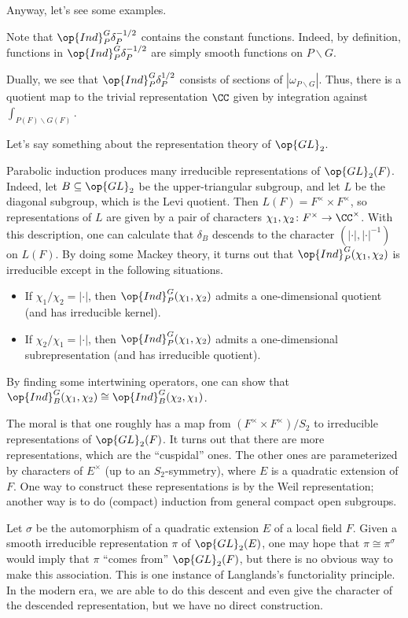 \documentclass[../notes.tex]{subfiles}
\begin{document}
Anyway, let's see some examples.
\begin{example}
	Note that $\op{Ind}_P^G\delta_P^{-1/2}$ contains the constant functions. Indeed, by definition, functions in $\op{Ind}_P^G\delta_P^{-1/2}$ are simply smooth functions on $P\backslash G$.
\end{example}
\begin{example}
	Dually, we see that $\op{Ind}_P^G\delta_P^{1/2}$ consists of sections of $\left|\omega_{P\backslash G}\right|$. Thus, there is a quotient map to the trivial representation $\CC$ given by integration against $\int_{P(F)\backslash G(F)}$.
\end{example}
Let's say something about the representation theory of $\op{GL}_2$.
\begin{example}
	Parabolic induction produces many irreducible representations of $\op{GL}_2(F)$. Indeed, let $B\subseteq\op{GL}_2$ be the upper-triangular subgroup, and let $L$ be the diagonal subgroup, which is the Levi quotient. Then $L(F)=F^\times\times F^\times$, so representations of $L$ are given by a pair of characters $\chi_1,\chi_2\colon F^\times\to\CC^\times$. With this description, one can calculate that $\delta_B$ descends to the character $\left(\left|\cdot\right|,\left|\cdot\right|^{-1}\right)$ on $L(F)$. By doing some Mackey theory, it turns out that $\op{Ind}_P^G(\chi_1,\chi_2)$ is irreducible except in the following situations.
	\begin{itemize}
		\item If $\chi_1/\chi_2=\left|\cdot\right|$, then $\op{Ind}_P^G(\chi_1,\chi_2)$ admits a one-dimensional quotient (and has irreducible kernel).
		\item If $\chi_2/\chi_1=\left|\cdot\right|$, then $\op{Ind}_P^G(\chi_1,\chi_2)$ admits a one-dimensional subrepresentation (and has irreducible quotient).
	\end{itemize}
	By finding some intertwining operators, one can show that $\op{Ind}_B^G(\chi_1,\chi_2)\cong\op{Ind}_B^G(\chi_2,\chi_1)$.
\end{example}
\begin{remark}
	The moral is that one roughly has a map from $(F^\times\times F^\times)/S_2$ to irreducible representations of $\op{GL}_2(F)$. It turns out that there are more representations, which are the ``cuspidal'' ones. The other ones are parameterized by characters of $E^\times$ (up to an $S_2$-symmetry), where $E$ is a quadratic extension of $F$. One way to construct these representations is by the Weil representation; another way is to do (compact) induction from general compact open subgroups.
\end{remark}
\begin{remark}
	Let $\sigma$ be the automorphism of a quadratic extension $E$ of a local field $F$. Given a smooth irreducible representation $\pi$ of $\op{GL}_2(E)$, one may hope that $\pi\cong\pi^\sigma$ would imply that $\pi$ ``comes from'' $\op{GL}_2(F)$, but there is no obvious way to make this association. This is one instance of Langlands's functoriality principle. In the modern era, we are able to do this descent and even give the character of the descended representation, but we have no direct construction.
\end{remark}
\end{document}
